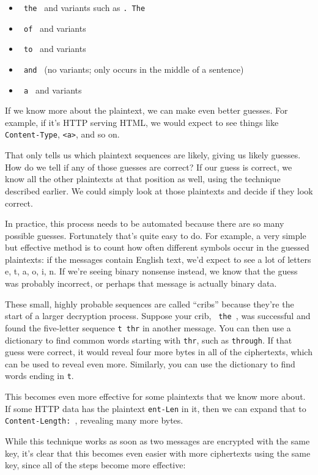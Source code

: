 \documentclass[11pt,ebook,table,dvipsnames]{memoir}
\begin{document}
\begin{itemize}
\item \verb*| the | and variants such as \verb*|. The |
\item \verb*| of | and variants
\item \verb*| to | and variants
\item \verb*| and | (no variants; only occurs in the middle of a sentence)
\item \verb*| a | and variants
\end{itemize}

If we know more about the plaintext, we can make even better guesses.
For example, if it's HTTP serving HTML, we would expect to see things
like \texttt{Content-Type}, \texttt{<a>}, and so on.

That only tells us which plaintext sequences are likely, giving us
likely guesses. How do we tell if any of those guesses are correct? If
our guess is correct, we know all the other plaintexts at that
position as well, using the technique described earlier. We could
simply look at those plaintexts and decide if they look correct.

In practice, this process needs to be automated because there are so
many possible guesses. Fortunately that's quite easy to do. For
example, a very simple but effective method is to count how often
different symbols occur in the guessed plaintexts: if the messages
contain English text, we'd expect to see a lot of letters e, t, a, o,
i, n. If we're seeing binary nonsense instead, we know that the guess
was probably incorrect, or perhaps that message is actually binary
data.

These small, highly probable sequences are called \enquote{cribs} because
they're the start of a larger decryption process. Suppose your crib,
\verb*| the |, was successful and found the five-letter sequence
\verb*|t thr| in another message. You can then use a dictionary to
find common words starting with \texttt{thr}, such as \texttt{through}. If that
guess were correct, it would reveal four more bytes in all of the
ciphertexts, which can be used to reveal even more. Similarly, you can
use the dictionary to find words ending in \texttt{t}.

This becomes even more effective for some plaintexts that we know more
about. If some HTTP data has the plaintext \texttt{ent-Len} in it, then we
can expand that to \verb*|Content-Length: |, revealing many more
bytes.

While this technique works as soon as two messages are encrypted with
the same key, it's clear that this becomes even easier with more
ciphertexts using the same key, since all of the steps become more
effective:
\end{document}
